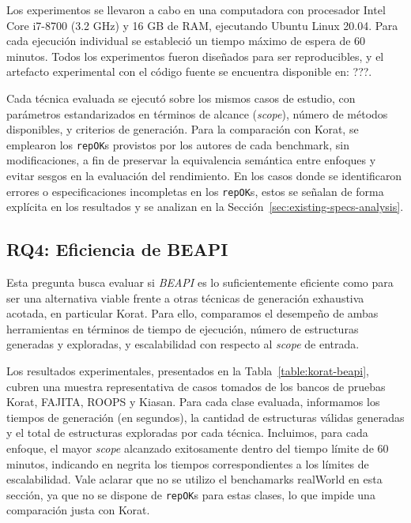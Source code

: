 Los experimentos se llevaron a cabo en una computadora con procesador Intel Core i7-8700 
(3.2 GHz) y 16 GB de RAM, ejecutando Ubuntu Linux 20.04. Para cada ejecución individual se estableció 
un tiempo máximo de espera de 60 minutos. Todos los experimentos fueron diseñados para ser reproducibles, 
y el artefacto experimental con el código fuente se encuentra disponible en: ???.

Cada técnica evaluada se ejecutó sobre los mismos casos de estudio, con parámetros estandarizados 
en términos de alcance (\textit{scope}), número de métodos disponibles, y criterios de generación. 
Para la comparación con \textsf{Korat}, se emplearon los \texttt{repOK}s provistos por los autores 
de cada benchmark, sin modificaciones, a fin de preservar la equivalencia semántica entre enfoques 
y evitar sesgos en la evaluación del rendimiento. En los casos donde se identificaron errores o 
especificaciones incompletas en los \texttt{repOK}s, estos se señalan de forma explícita en los 
resultados y se analizan en la Sección~\ref{sec:existing-specs-analysis}.



\subsection{RQ4: Eficiencia de BEAPI}

Esta pregunta busca evaluar si \emph{BEAPI} es lo suficientemente eficiente como para ser una 
alternativa viable frente a otras técnicas de generación exhaustiva acotada, en particular 
\textsf{Korat}. Para ello, comparamos el desempeño de ambas herramientas en términos de tiempo 
de ejecución, número de estructuras generadas y exploradas, y escalabilidad con respecto al 
\emph{scope} de entrada.

Los resultados experimentales, presentados en la Tabla~\ref{table:korat-beapi}, cubren una muestra 
representativa de casos tomados de los bancos de pruebas \textsf{Korat}, \textsf{FAJITA}, 
\textsf{ROOPS} y \textsf{Kiasan}. Para cada clase evaluada, informamos los tiempos de generación 
(en segundos), la cantidad de estructuras válidas generadas y el total de estructuras exploradas 
por cada técnica. Incluimos, para cada enfoque, el mayor \emph{scope} alcanzado exitosamente dentro 
del tiempo límite de 60 minutos, indicando en negrita los tiempos correspondientes a los límites 
de escalabilidad. Vale aclarar que no se utilizo el benchamarks \textsf{realWorld} en esta sección, ya que
no se dispone de \texttt{repOK}s para estas clases, lo que impide una comparación justa con \textsf{Korat}.

